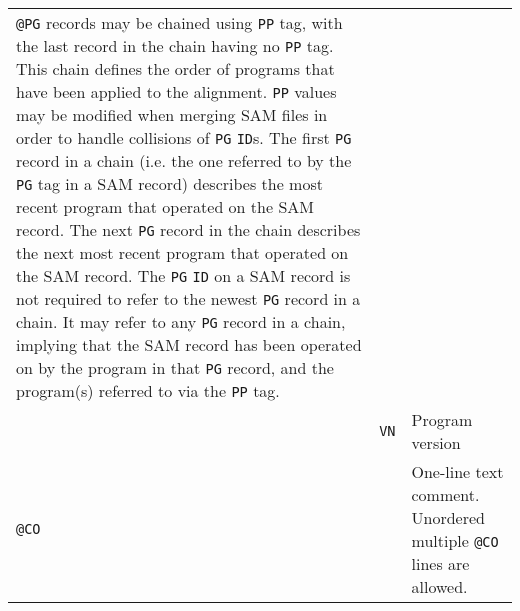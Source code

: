 \documentclass[10pt]{article}
\begin{document}
\begin{center}
\begin{longtable}{|l|l|p{13.5cm}|}
  	{\tt @PG} records may be chained using {\tt PP} tag, with the last record in the chain
	having no {\tt PP} tag. This chain defines the order of programs that have been applied to the alignment.
	{\tt PP} values may be modified when merging SAM files in order to handle collisions of {\tt PG} {\tt ID}s.
	The first {\tt PG} record in a chain (i.e. the one referred to by the {\tt PG} tag in a SAM record)
	describes the most recent program that operated on the SAM record.
	The next {\tt PG} record in the chain describes the next most recent program that
        operated on the SAM record. The {\tt PG} {\tt ID} on a SAM record is not required
        to refer to the newest {\tt PG} record in a chain.  It may refer to any {\tt PG}
        record in a chain, implying that the SAM record has been operated on by the
        program in that {\tt PG} record, and the program(s) referred to via the {\tt PP} tag. \\\cline{2-3}
  & {\tt VN} & Program version \\\cline{1-3}
  \multicolumn{2}{|l}{\tt @CO} & One-line text comment. Unordered multiple {\tt @CO} lines are allowed.\\
  \cline{1-3}
\end{longtable}
\end{center}
\end{document}
